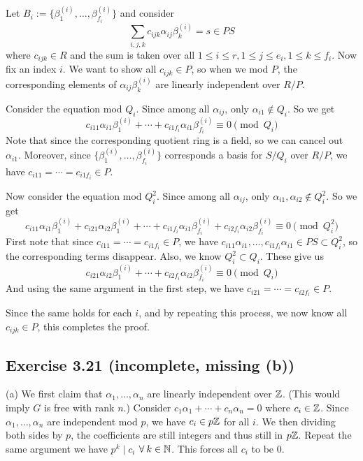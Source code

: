 \documentclass[../Marcus.tex]{subfiles}
\begin{document}
Let $B_i:=\{\beta^{(i)}_1,\ldots,\beta^{(i)}_{f_i}\}$ and consider $$\sum_{i,j,k} c_{ijk}\alpha_{ij}\beta^{(i)}_k=s\in PS$$ where $c_{ijk}\in R$ and the sum is taken over all $1\leq i\leq r,1\leq j\leq e_i,1\leq k\leq f_i$. Now fix an index $i$. We want to show all $c_{ijk}\in P$, so when we mod $P$, the corresponding elements of $\alpha_{ij}\beta^{(i)}_k$ are linearly independent over $R/P$.

Consider the equation mod $Q_i$. Since among all $\alpha_{ij}$, only $\alpha_{i1}\notin Q_i$. So we get $$c_{i11}\alpha_{i1}\beta^{(i)}_1+\cdots+c_{i1f_i}\alpha_{i1}\beta^{(i)}_{f_i}\equiv0\pmod{Q_i}$$ Note that since the corresponding quotient ring is a field, so we can cancel out $\alpha_{i1}$. Moreover, since $\{\beta^{(i)}_1,\ldots,\beta^{(i)}_{f_i}\}$ corresponds a basis for $S/Q_i$ over $R/P$, we have $c_{i11}=\cdots=c_{i1f_i}\in P$.

Now consider the equation mod $Q^2_i$. Since among all $\alpha_{ij}$, only $\alpha_{i1},\alpha_{i2}\notin Q^2_i$. So we get $$c_{i11}\alpha_{i1}\beta^{(i)}_1+c_{i21}\alpha_{i2}\beta^{(i)}_1+\cdots+c_{i1f_i}\alpha_{i1}\beta^{(i)}_{f_i}+c_{i2f_i}\alpha_{i2}\beta^{(i)}_{f_i}\equiv0\pmod{Q^2_i}$$ First note that since $c_{i11}=\cdots=c_{i1f_i}\in P$, we have $c_{i11}\alpha_{i1},\ldots,c_{i1f_i}\alpha_{i1}\in PS\subset Q^2_i$, so the corresponding terms disappear. Also, we know $Q_i^2\subset Q_i$. These give us $$c_{i21}\alpha_{i2}\beta^{(i)}_1+\cdots+c_{i2f_i}\alpha_{i2}\beta^{(i)}_{f_i}\equiv0\pmod{Q_i}$$ And using the same argument in the first step, we have $c_{i21}=\cdots=c_{i2f_i}\in P$.

Since the same holds for each $i$, and by repeating this process, we now know all $c_{ijk}\in P$, this completes the proof. 

\subsection*{Exercise 3.21 \color{red}(incomplete, missing (b))}

(a) We first claim that $\alpha_1,\ldots,\alpha_n$ are linearly independent over $\mathbb{Z}$. (This would imply $G$ is free with rank $n$.) Consider $c_1\alpha_1+\cdots+c_n\alpha_n=0$ where $c_i\in\mathbb{Z}$. Since $\alpha_1,\ldots,\alpha_n$ are independent mod $p$, we have $c_i\in p\mathbb{Z}$ for all $i$. We then dividing both sides by $p$, the coefficients are still integers and thus still in $p\mathbb{Z}$. Repeat the same argument we have $p^k\mid c_i$ $\forall k\in\NN$. This forces all $c_i$ to be 0.
\end{document}

